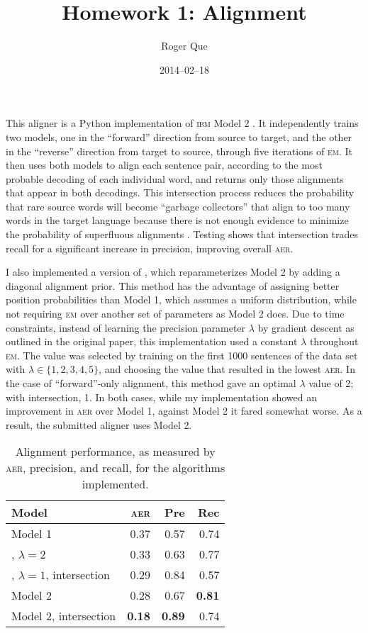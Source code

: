 \documentclass[11pt,twocolumn]{article}
\begin{document}
\title{Homework 1: Alignment}
\author{Roger Que}
\date{2014--02--18}
\maketitle

This aligner is a Python implementation of \textsc{ibm} Model 2
\cite{Brown:1993}.
It independently trains two models, one in the ``forward'' direction
from source to target, and the other in the ``reverse'' direction from
target to source, through five iterations of \textsc{em}.
It then uses both models to align each sentence pair, according to the
most probable decoding of each individual word, and returns only those
alignments that appear in both decodings.
This intersection process reduces the probability that rare source words
will become ``garbage collectors'' that align to too many words in the
target language because there is not enough evidence to minimize the
probability of superfluous alignments \cite{Moore:2004, Liang:2006}.
Testing shows that intersection trades recall for a significant increase
in precision, improving overall \textsc{aer}.

I also implemented a version of \cite{Dyer:2013}, which reparameterizes
Model 2 by adding a diagonal alignment prior.
This method has the advantage of assigning better position probabilities
than Model 1, which assumes a uniform distribution, while not requiring
\textsc{em} over another set of parameters as Model 2 does.
Due to time constraints, instead of learning the precision parameter
$\lambda$ by gradient descent as outlined in the original paper, this
implementation used a constant $\lambda$ throughout \textsc{em}.
The value was selected by training on the first 1000 sentences of the
data set with $\lambda\in\{1,2,3,4,5\}$, and choosing the value that
resulted in the lowest \textsc{aer}.
In the case of ``forward''-only alignment, this method gave an optimal
$\lambda$ value of 2; with intersection, 1.
In both cases, while my implementation showed an improvement in
\textsc{aer} over Model 1, against Model 2 it fared somewhat worse.
As a result, the submitted aligner uses Model 2.

\begin{table}
\center
\begin{tabular}{lrrr}
\textbf{Model} &
\textbf{\textsc{aer}} & \textbf{Pre} & \textbf{Rec} \\
\hline
Model 1 &
0.37 & 0.57 & 0.74 \\
\cite{Dyer:2013}, $\lambda=2$ &
0.33 & 0.63 & 0.77 \\
\cite{Dyer:2013}, $\lambda=1$, intersection &
0.29 & 0.84 & 0.57 \\
Model 2 &
0.28 & 0.67 & \textbf{0.81} \\
Model 2, intersection &
\textbf{0.18} & \textbf{0.89} & 0.74
\end{tabular}
\caption{Alignment performance, as measured by \textsc{aer}, precision,
and recall, for the algorithms implemented.}
\end{table}
\end{document}
